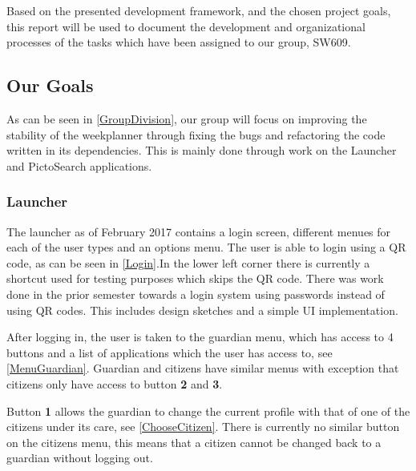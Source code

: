 Based on the presented development framework, and the chosen project goals, this
report will be used to document the development and organizational processes of
the tasks which have been assigned to our group, SW609.

\subsection{Our Goals}
As can be seen in \autoref{GroupDivision}, our group will focus on improving the
stability of the weekplanner through fixing the bugs and refactoring the code
written in its dependencies. This is mainly done through work on the Launcher
and PictoSearch applications.

\subsubsection{Launcher}\label{LauncherReview}
 The launcher as of February 2017 contains
a login screen, different menues for each of the user types and an options menu. The user is able to login using a QR
code, as can be seen in \autoref{Login}.In the lower left corner there is
currently a shortcut used for testing purposes which skips the QR code. There
was work done in the prior semester towards a login system using passwords
instead of using QR codes. This includes design sketches and a simple UI
implementation.


After logging in, the user is taken to the guardian menu, which has access to 4
buttons and a list of applications which the user has access to,
see \autoref{MenuGuardian}. Guardian and citizens have similar menus with
exception that citizens only have access to button \textbf{2} and \textbf{3}.


Button \textbf{1} allows the guardian to change the current profile with that of
one of the citizens under its care, see \autoref{ChooseCitizen}. There is currently no
similar button on the citizens menu, this means that a citizen cannot be changed
back to a guardian without logging out.


